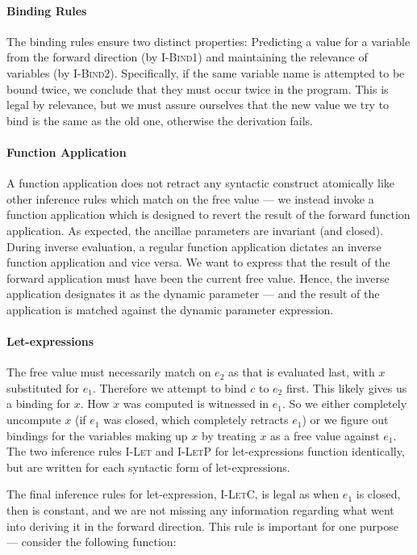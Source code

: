 \paragraph{Binding Rules}

The binding rules ensure two distinct properties: Predicting a value for a
variable from the forward direction (by \textsc{I-Bind1}) and maintaining the
relevance of variables (by \textsc{I-Bind2}). Specifically, if the same
variable name is attempted to be bound twice, we conclude that they must occur
twice in the program. This is legal by relevance, but we must assure ourselves
that the new value we try to bind is the same as the old one, otherwise the
derivation fails.

\paragraph{Function Application}

A function application does not retract any syntactic construct atomically like
other inference rules which match on the free value --- we instead invoke a
function application which is designed to revert the result of the forward
function application. As expected, the ancillae parameters are invariant (and
closed). During inverse evaluation, a regular function application dictates an
inverse function application and vice versa. We want to express that the result
of the forward application must have been the current free value. Hence, the
inverse application designates it as the dynamic parameter --- and the result
of the application is matched against the dynamic parameter expression.

\paragraph{Let-expressions}

The free value must necessarily match on $e_2$ as that is evaluated last, with
$x$ substituted for $e_1$. Therefore we attempt to bind $c$ to $e_2$ first.
This likely gives us a binding for $x$. How $x$ was computed is witnessed in
$e_1$. So we either completely uncompute $x$ (if $e_1$ was closed, which
completely retracts $e_1$) or we figure out bindings for the variables making
up $x$ by treating $x$ as a free value against $e_1$. The two inference rules
\textsc{I-Let} and \textsc{I-LetP} for let-expressions function identically,
but are written for each syntactic form of let-expressions.

The final inference rules for let-expression, \textsc{I-LetC}, is legal as when
$e_1$ is closed, then is constant, and we are not missing any information
regarding what went into deriving it in the forward direction. This rule is
important for one purpose --- consider the following function:

